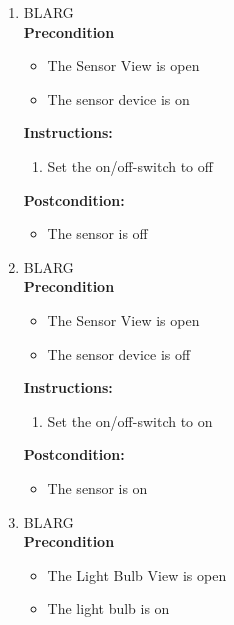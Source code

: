 \documentclass[a4paper]{article}
\newlength{\testlabellength}
\newenvironment{testlist}{\begin{enumerate}[label=\bfseries Instruction \thesubsection.\arabic* , labelindent=0pt, labelwidth=\testlabellength , leftmargin=2cm]}{\end{enumerate}}
\newenvironment{precondition}{
{\color{white}BLARG}\\ 
\textbf{Precondition}
\begin{itemize}[labelindent=0cm, labelwidth=2cm , leftmargin=1cm]
}
{\end{itemize}}
\newenvironment{instruction}{
\textbf{Instructions:}
\begin{enumerate}[label=\bfseries  \arabic*., labelindent=0cm, labelwidth=2cm , leftmargin=1cm]
}
{\end{enumerate}}
\newenvironment{postcondition}{
\textbf{Postcondition:}
\begin{itemize}[labelindent=0cm, labelwidth=2cm , leftmargin=1cm]
}
{\end{itemize}}
\begin{document}
\begin{appendices}
\begin{testlist}
	\item
		\begin{precondition}
			\item The Sensor View is open
			\item The sensor device is on
		\end{precondition}
		\begin{instruction}
			\item Set the on/off-switch to off
		\end{instruction}
		\begin{postcondition}
			\item The sensor is off
		\end{postcondition}

	\item
		\begin{precondition}
			\item The Sensor View is open
			\item The sensor device is off
		\end{precondition}
		\begin{instruction}
			\item Set the on/off-switch to on
		\end{instruction}
		\begin{postcondition}
			\item The sensor is on
		\end{postcondition}

	\item
		\begin{precondition}
			\item The Light Bulb View is open
			\item The light bulb is on


\end{precondition}
\end{testlist}
\end{appendices}
\end{document}
